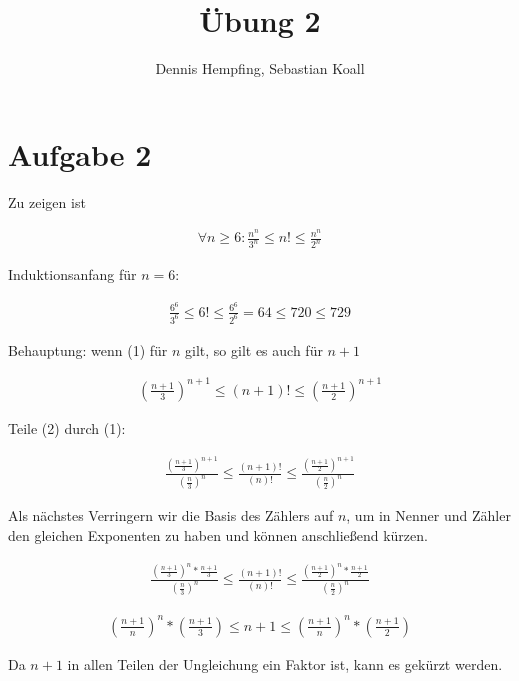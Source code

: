 \documentclass[12pt]{scrartcl}%
\theoremstyle{nonumberplain}
\begin{document}
\author{Dennis Hempfing, Sebastian Koall}
\title{Übung 2}
\date{} 
\pagestyle{myheadings}

\maketitle %
 
\section*{Aufgabe 2}

Zu zeigen ist

\begin{align}
	\forall n \ge 6: \frac{n^n}{3^n} \le n! \le \frac{n^n}{2^n}
\end{align}

Induktionsanfang für $n = 6$:

\begin{align*}
	\frac{6^6}{3^6} \le 6! \le \frac{6^6}{2^6} = 64 \le 720 \le 729
\end{align*}

Behauptung: wenn (1) für $n$ gilt, so gilt es auch für $n+1$

\begin{align}
	(\frac{n+1}{3})^{n+1} \le (n+1)! \le (\frac{n+1}{2})^{n+1}
\end{align}

Teile (2) durch (1):

\begin{align}
	\frac{(\frac{n+1}{3})^{n+1}}{(\frac{n}{3})^{n}} \le \frac{(n+1)!}{(n)!} \le \frac{(\frac{n+1}{2})^{n+1}}{(\frac{n}{2})^{n}}
\end{align}

Als nächstes Verringern wir die Basis des Zählers auf $n$, um in Nenner und Zähler den gleichen Exponenten zu haben und können anschließend kürzen.

\begin{align*}
	\frac{(\frac{n+1}{3})^{n}*\frac{n+1}{3}}{(\frac{n}{3})^{n}} \le \frac{(n+1)!}{(n)!} \le \frac{(\frac{n+1}{2})^{n}*\frac{n+1}{2}}{(\frac{n}{2})^{n}}
\end{align*}

\begin{align*}
	(\frac{n+1}{n})^{n} * (\frac{n+1}{3}) \le n+1 \le (\frac{n+1}{n})^{n} * (\frac{n+1}{2})
\end{align*}

Da $n+1$ in allen Teilen der Ungleichung ein Faktor ist, kann es gekürzt werden.
\end{document}
